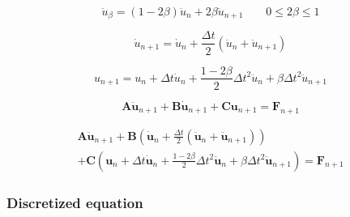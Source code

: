 \documentclass[a4paper,10pt]{book}
\begin{document}
    \begin{equation}
    \ddot{u}_{\beta} = \left(1-2\beta\right)\ddot{u}_{n} + 2 \beta\ddot{u}_{n+1} \qquad 0 \leq 2\beta \leq 1
    \end{equation}

    \begin{equation}
    \dot{u}_{n+1} = \dot{u}_{n} + \frac{\Delta t}{2} \left( \ddot{u}_{n} + \ddot{u}_{n+1} \right)
    \end{equation}

    \begin{equation}
    u_{n+1} = u_{n} + \Delta t \dot{u}_{n} + \frac{1-2\beta}{2} \Delta t^{2} \ddot{u}_{n} + \beta \Delta t^{2} \ddot{u}_{n+1}
    \end{equation}

    \begin{equation}
    \mathbf{A}\ddot{\mathbf{u}}_{n+1} + \mathbf{B}\dot{\mathbf{u}}_{n+1} + \mathbf{C}\mathbf{u}_{n+1} = \mathbf{F}_{n+1}
    \end{equation}

    \begin{equation}
    \begin{aligned}
    \mathbf{A}\ddot{\mathbf{u}}_{n+1}
    + \mathbf{B}\left( \dot{\mathbf{u}}_{n} + \frac{\Delta t}{2} \left( \ddot{\mathbf{u}}_{n} + \ddot{\mathbf{u}}_{n+1} \right) \right) \\
    + \mathbf{C}\left( \mathbf{u}_{n} + \Delta t \dot{\mathbf{u}}_{n} + \frac{1-2\beta}{2} \Delta t^{2} \ddot{\mathbf{u}}_{n} + \beta \Delta t^{2} \ddot{\mathbf{u}}_{n+1} \right)
    = \mathbf{F}_{n+1}
    \end{aligned}
    \end{equation}

\iffalse
    \begin{equation}
    \begin{aligned}
    \end{aligned}
    \end{equation}
\fi

\subsubsection{Discretized equation}
\end{document}
